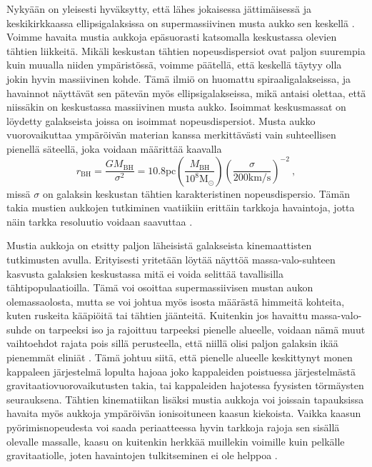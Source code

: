 \documentclass[12pt,a4paper]{article}
\begin{document}
Nykyään on yleisesti hyväksytty, että lähes jokaisessa jättimäisessä ja keskikirkkaassa ellipsigalaksissa on supermassiivinen musta aukko sen keskellä \citep{kormendy:1995, ferrarese:2005}. Voimme havaita mustia aukkoja epäsuorasti katsomalla keskustassa olevien tähtien liikkeitä. Mikäli keskustan tähtien nopeusdispersiot ovat paljon suurempia kuin muualla niiden ympäristössä, voimme päätellä, että keskellä täytyy olla jokin hyvin massiivinen kohde. Tämä ilmiö on huomattu spiraaligalakseissa, ja havainnot näyttävät sen pätevän myös ellipsigalakseissa, mikä antaisi olettaa, että niissäkin on keskustassa massiivinen musta aukko. Isoimmat keskusmassat on löydetty galakseista joissa on isoimmat nopeusdispersiot. Musta aukko vuorovaikuttaa ympäröivän materian kanssa merkittävästi vain suhteellisen pienellä säteellä, joka voidaan määrittää kaavalla
\begin{equation}
r_{\mathrm{BH}} = \frac{G M_{\mathrm{BH}}}{\sigma^2} = 10.8 \mathrm{pc} \left( \frac{M_{\mathrm{BH}}}{10^8 \mathrm{M_\odot}} \right) \left( \frac{\sigma}{200 \mathrm{km/s}} \right)^{-2} \ ,
\end{equation}
missä $\sigma$ on galaksin keskustan tähtien karakteristinen nopeusdispersio. Tämän takia mustien aukkojen tutkiminen vaatiikiin erittäin tarkkoja havaintoja, jotta näin tarkka resoluutio voidaan saavuttaa \citep{galform}.

Mustia aukkoja on etsitty paljon läheisistä galakseista kinemaattisten tutkimusten avulla. Erityisesti yritetään löytää näyttöä massa-valo-suhteen kasvusta galaksien keskustassa mitä ei voida selittää tavallisilla tähtipopulaatioilla. Tämä voi osoittaa supermassiivisen mustan aukon olemassaolosta, mutta se voi johtua myös isosta määrästä himmeitä kohteita, kuten ruskeita kääpiöitä tai tähtien jäänteitä. Kuitenkin jos havaittu massa-valo-suhde on tarpeeksi iso ja rajoittuu tarpeeksi pienelle alueelle, voidaan nämä muut vaihtoehdot rajata pois sillä perusteella, että niillä olisi paljon galaksin ikää pienemmät eliniät \citep{maoz:1998}. Tämä johtuu siitä, että pienelle alueelle keskittynyt monen kappaleen järjestelmä lopulta hajoaa joko kappaleiden poistuessa järjestelmästä gravitaatiovuorovaikutusten takia, tai kappaleiden hajotessa fyysisten törmäysten seurauksena. Tähtien kinematiikan lisäksi mustia aukkoja voi joissain tapauksissa havaita myös aukkoja ympäröivän ionisoituneen kaasun kiekoista. Vaikka kaasun pyörimisnopeudesta voi saada periaatteessa hyvin tarkkoja rajoja sen sisällä olevalle massalle, kaasu on kuitenkin herkkää muillekin voimille kuin pelkälle gravitaatiolle, joten havaintojen tulkitseminen ei ole helppoa \citep{harms:1994, marel:1998}.
 
\end{document}
